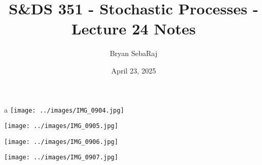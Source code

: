 \documentclass{article}
\title{S\&DS 351 - Stochastic Processes - Lecture 24 Notes}
\author{Bryan SebaRaj}
\date{April 23, 2025}
\begin{document}
\maketitle
a
\texttt{[image: ../images/IMG\_0904.jpg]}

\texttt{[image: ../images/IMG\_0905.jpg]}

\texttt{[image: ../images/IMG\_0906.jpg]}

\texttt{[image: ../images/IMG\_0907.jpg]}



\end{document}
